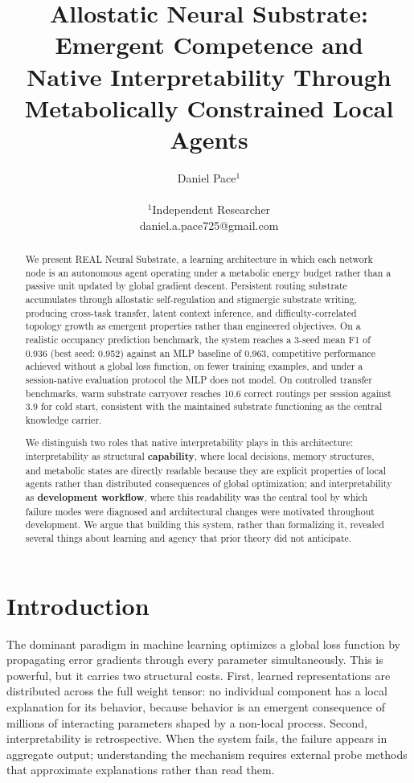 \documentclass[letterpaper]{article}
\title{Allostatic Neural Substrate: Emergent Competence and\\
Native Interpretability Through Metabolically Constrained Local Agents}
\author{
    Daniel Pace$^{1}$ \\
    \mbox{}\\
    $^1$Independent Researcher \\
    daniel.a.pace725@gmail.com
}
\begin{document}
\maketitle

\begin{abstract}
We present REAL Neural Substrate, a learning architecture in which each network
node is an autonomous agent operating under a metabolic energy budget rather than
a passive unit updated by global gradient descent. Persistent routing substrate
accumulates through allostatic self-regulation and stigmergic substrate writing,
producing cross-task transfer, latent context inference, and difficulty-correlated
topology growth as emergent properties rather than engineered objectives. On a
realistic occupancy prediction benchmark, the system reaches a 3-seed mean F1 of
0.936 (best seed: 0.952) against an MLP baseline of 0.963, competitive performance
achieved without a global loss function, on fewer training examples, and under a
session-native evaluation protocol the MLP does not model. On controlled transfer
benchmarks, warm substrate carryover reaches 10.6 correct routings per session
against 3.9 for cold start, consistent with the maintained substrate functioning
as the central knowledge carrier.

We distinguish two roles that native interpretability plays in this architecture:
interpretability as structural \textbf{capability}, where local decisions, memory
structures, and metabolic states are directly readable because they are explicit
properties of local agents rather than distributed consequences of global
optimization; and interpretability as \textbf{development workflow}, where this
readability was the central tool by which failure modes were diagnosed and
architectural changes were motivated throughout development. We argue that building
this system, rather than formalizing it, revealed several things about learning and
agency that prior theory did not anticipate.
\end{abstract}

\section{Introduction}

The dominant paradigm in machine learning optimizes a global loss function by
propagating error gradients through every parameter simultaneously. This is
powerful, but it carries two structural costs. First, learned representations are
distributed across the full weight tensor: no individual component has a local
explanation for its behavior, because behavior is an emergent consequence of
millions of interacting parameters shaped by a non-local process. Second,
interpretability is retrospective. When the system fails, the failure appears in
aggregate output; understanding the mechanism requires external probe methods that
approximate explanations rather than read them.
\end{document}
